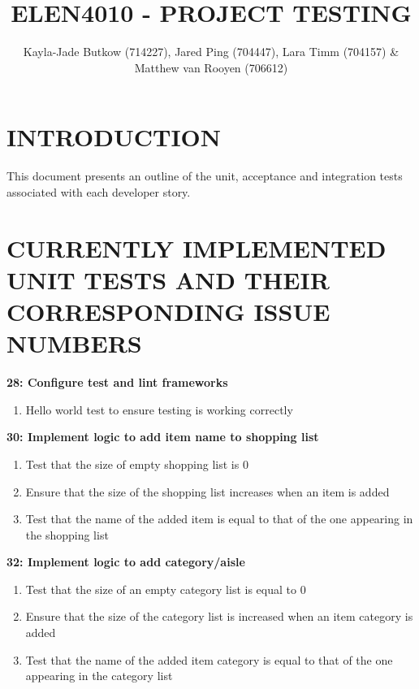 \documentclass[10pt,onecolumn]{witseiepaper}
\title{ELEN4010 - PROJECT TESTING}
\author{Kayla-Jade Butkow (714227), Jared Ping (704447), Lara Timm (704157) \& Matthew van Rooyen (706612)}
\begin{document}
\maketitle
\pagestyle{plain}
\setcounter{page}{1}

\section*{INTRODUCTION}
This document presents an outline of the unit, acceptance and integration tests associated with each developer story.


\section*{CURRENTLY IMPLEMENTED UNIT TESTS AND THEIR CORRESPONDING ISSUE NUMBERS}

\textbf{28: Configure test and lint frameworks}

\begin{enumerate}
	\item Hello world test to ensure testing is working correctly
\end{enumerate}

\textbf{30: Implement logic to add item name to shopping list}

\begin{enumerate}
	\item Test that the size of empty shopping list is 0
	\item Ensure that the size of the shopping list increases when an item is added
	\item Test that the name of the added item is equal to that of the one appearing in the shopping list
\end{enumerate}

\textbf{32: Implement logic to add category/aisle}

\begin{enumerate}
	\item Test that the size of an empty category list is equal to 0
	\item Ensure that the size of the category list is increased when an item category is added
	\item Test that the name of the added item category is equal to that of the one appearing in the category list
\end{enumerate}
\end{document}
